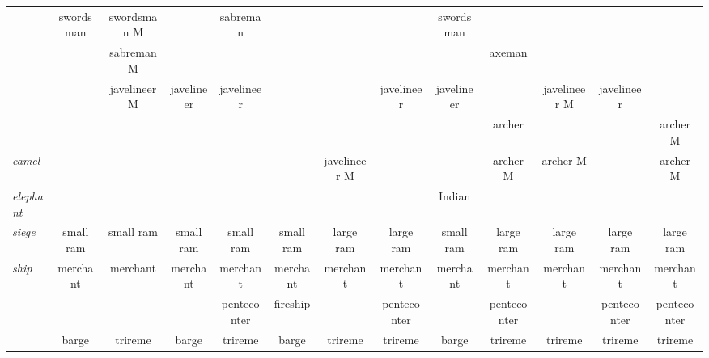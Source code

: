\documentclass{article}
\begin{document}
\begin{landscape}
\begin{tabular}{l||c|c|c|c||c|c|c|c||c|c|c|c}
 & swordsman      & swordsman M    &                & sabreman       &                &                &                & swordsman      &                &                &                &                \\
 &                & sabreman M     &                &                &                &                &                &                & axeman         &                &                &                \\
 &                & javelineer M   & javelineer     & javelineer     &                &                & javelineer     & javelineer     &                & javelineer M   & javelineer     &                \\
 &                &                &                &                &                &                &                &                & archer         &                &                & archer M       \\
\hline\textit{camel}
 &                &                &                &                &                & javelineer M   &                &                & archer M       & archer M       &                & archer M       \\
\hline\textit{elephant}
 &                &                &                &                &                &                &                & Indian         &                &                &                &                \\
\hline\textit{siege} 
 & small ram      & small ram      & small ram      & small ram      & small ram      & large ram      & large ram      & small ram      & large ram      & large ram      & large ram      & large ram      \\
\hline\textit{ship}
 & merchant       & merchant       & merchant       & merchant       & merchant       & merchant       & merchant       & merchant       & merchant       & merchant       & merchant       & merchant       \\
 &                &                &                & penteconter    & fireship       &                & penteconter    &                & penteconter    &                & penteconter    & penteconter    \\
 & barge          & trireme        & barge          & trireme        & barge          & trireme        & trireme        & barge          & trireme        & trireme        & trireme        & trireme        \\


\end{tabular}
\end{landscape}
\end{document}

